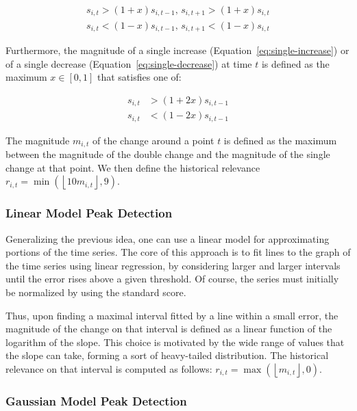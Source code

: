 \begin{align}
\label{eq:double-increase}
s_{i, t} > \left( 1 + x \right) s_{i, t - 1}, \, s_{i, t + 1} > \left( 1 + x \right) s_{i, t}
\\
\label{eq:double-decrease}
s_{i, t} < \left( 1 - x \right) s_{i, t - 1}, \, s_{i, t + 1} < \left( 1 - x \right) s_{i, t}
\end{align}

Furthermore, the magnitude of a single increase (Equation~\ref{eq:single-increase}) or of a single decrease (Equation~\ref{eq:single-decrease}) at time $t$ is defined as the maximum $x \in \left[ 0, 1 \right]$ that satisfies one of:

\begin{align}
\label{eq:single-increase}
s_{i, t} &> \left( 1 + 2x \right) s_{i, t - 1}
\\
\label{eq:single-decrease}
s_{i, t} &< \left( 1 - 2x \right) s_{i, t - 1}
\end{align}

The magnitude $m_{i, t}$ of the change around a point $t$ is defined as the maximum between the magnitude of the double change and the magnitude of the single change at that point. We then define the historical relevance $r_{i, t} = \min \left( \left\lfloor 10 m_{i, t} \right\rfloor, 9 \right)$.

\subsubsection{Linear Model Peak Detection}

Generalizing the previous idea, one can use a linear model for approximating portions of the time series. The core of this approach is to fit lines to the graph of the time series using linear regression, by considering larger and larger intervals until the error rises above a given threshold. Of course, the series must initially be normalized by using the standard score.

Thus, upon finding a maximal interval fitted by a line within a small error, the magnitude of the change on that interval is defined as a linear function of the logarithm of the slope. This choice is motivated by the wide range of values that the slope can take, forming a sort of heavy-tailed distribution. The historical relevance on that interval is computed as follows: $r_{i, t} = \max \left( \left\lfloor m_{i, t} \right\rfloor, 0 \right)$.

\subsubsection{Gaussian Model Peak Detection}

